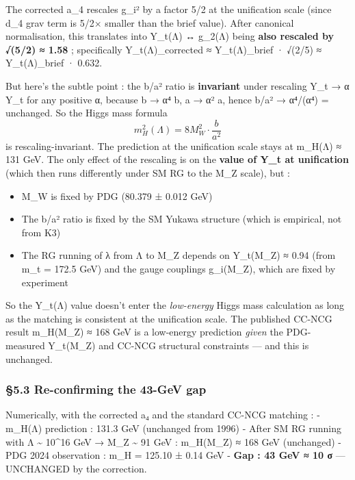 \documentclass[
  11pt,
  a4paper,
]{article}
\providecommand{\tightlist}{\setlength{\itemsep}{0pt}\setlength{\parskip}{0pt}}
\providecommand{\tightlist}{%
  \setlength{\itemsep}{0pt}\setlength{\parskip}{0pt}}
\begin{document}
The corrected a\_4 rescales g\_i² by a factor 5/2 at the unification scale (since d\_4 grav term is 5/2× smaller than the brief value). After canonical normalisation, this translates into Y\_t(Λ) ↔ g\_2(Λ) being \textbf{also rescaled by √(5/2) ≈ 1.58} ; specifically Y\_t(Λ)\_corrected ≈ Y\_t(Λ)\_brief · √(2/5) ≈ Y\_t(Λ)\_brief · 0.632.

But here's the subtle point : the b/a² ratio is \textbf{invariant} under rescaling Y\_t → α Y\_t for any positive α, because b → α⁴ b, a → α² a, hence b/a² → α⁴/(α⁴) = unchanged. So the Higgs mass formula
\[
m_H^2(\Lambda) = 8 M_W^2 \cdot \frac{b}{a^2}
\]
is rescaling-invariant. The prediction at the unification scale stays at m\_H(Λ) ≈ 131 GeV. The only effect of the rescaling is on the \textbf{value of Y\_t at unification} (which then runs differently under SM RG to the M\_Z scale), but :

\begin{itemize}
\tightlist
\item
  M\_W is fixed by PDG (80.379 ± 0.012 GeV)
\item
  The b/a² ratio is fixed by the SM Yukawa structure (which is empirical, not from K3)
\item
  The RG running of λ from Λ to M\_Z depends on Y\_t(M\_Z) ≈ 0.94 (from m\_t = 172.5 GeV) and the gauge couplings g\_i(M\_Z), which are fixed by experiment
\end{itemize}

So the Y\_t(Λ) value doesn't enter the \emph{low-energy} Higgs mass calculation as long as the matching is consistent at the unification scale. The published CC-NCG result m\_H(M\_Z) ≈ 168 GeV is a low-energy prediction \emph{given} the PDG-measured Y\_t(M\_Z) and CC-NCG structural constraints --- and this is unchanged.

\hypertarget{re-confirming-the-43-gev-gap}{%
\subsubsection{§5.3 Re-confirming the 43-GeV gap}\label{re-confirming-the-43-gev-gap}}

Numerically, with the corrected a₄ and the standard CC-NCG matching :
- m\_H(Λ) prediction : 131.3 GeV (unchanged from 1996)
- After SM RG running with Λ \textasciitilde{} 10\^{}16 GeV → M\_Z \textasciitilde{} 91 GeV : m\_H(M\_Z) ≈ 168 GeV (unchanged)
- PDG 2024 observation : m\_H = 125.10 ± 0.14 GeV
- \textbf{Gap : 43 GeV ≈ 10 σ} --- UNCHANGED by the correction.
\end{document}
